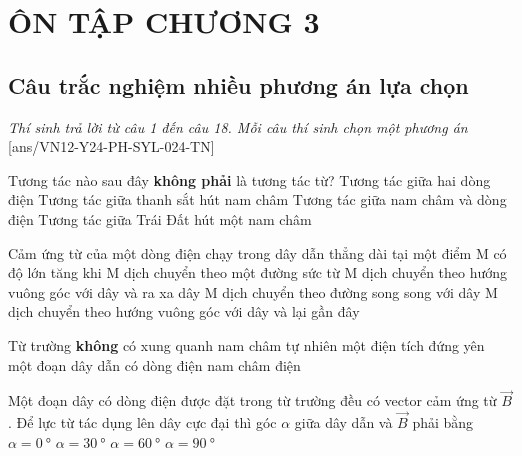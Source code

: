 \section{ÔN TẬP CHƯƠNG 3}
\subsection{Câu trắc nghiệm nhiều phương án lựa chọn}
\textit{Thí sinh trả lời từ câu 1 đến câu 18. Mỗi câu thí sinh chọn một phương án}
\setcounter{ex}{0}
[ans/VN12-Y24-PH-SYL-024-TN]
\begin{ex}
	Tương tác nào sau đây \textbf{không phải} là tương tác từ?
	\choice
	{Tương tác giữa hai dòng điện}
	{Tương tác giữa thanh sắt hút nam châm}
	{Tương tác giữa nam châm và dòng điện}
	{\True Tương tác giữa Trái Đất hút một nam châm}
	\loigiai{}
\end{ex}
\begin{ex}
	Cảm ứng từ của một dòng điện chạy trong dây dẫn thẳng dài tại một điểm M có độ lớn tăng khi
	\choice
	{M dịch chuyển theo một đường sức từ}
	{M dịch chuyển theo hướng vuông góc với dây và ra xa dây}
	{M dịch chuyển theo đường song song với dây}
	{\True M dịch chuyển theo hướng vuông góc với dây và lại gần đây}
	\loigiai{}
\end{ex}
\begin{ex}
	Từ trường \textbf{không} có xung quanh
	\choice
	{nam châm tự nhiên}
	{\True một điện tích đứng yên}
	{một đoạn dây dẫn có dòng điện}
	{nam châm điện}
	\loigiai{}
\end{ex}
\begin{ex}
	Một đoạn dây có dòng điện được đặt trong từ trường đều có vector cảm ứng từ $\vec{B}$. Để lực từ tác dụng lên dây cực đại thì góc $\alpha$ giữa dây dẫn và $\vec{B}$ phải bằng
	\choice
	{$\alpha=\SI{0}{\degree}$}
	{$\alpha=\SI{30}{\degree}$}
	{$\alpha=\SI{60}{\degree}$}
	{\True $\alpha=\SI{90}{\degree}$}
\end{ex}
